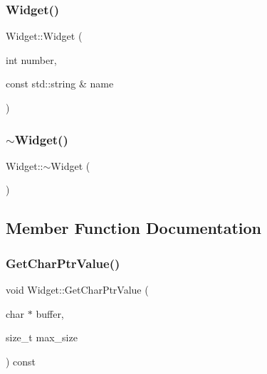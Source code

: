 \subsubsection{\texorpdfstring{Widget()}{Widget()}}
{\footnotesize\ttfamily Widget\+::\+Widget (\begin{DoxyParamCaption}\item[{int}]{number,  }\item[{const std\+::string \&}]{name }\end{DoxyParamCaption})}

\mbox{\label{classWidget_aa24f66bcbaaec6d458b0980e8c8eae65}} 
\subsubsection{\texorpdfstring{$\sim$\+Widget()}{~Widget()}}
{\footnotesize\ttfamily Widget\+::$\sim$\+Widget (\begin{DoxyParamCaption}{ }\end{DoxyParamCaption})}



\subsection{Member Function Documentation}
\mbox{\label{classWidget_a50791a556979f22f5593383143c7f815}} 
\subsubsection{\texorpdfstring{Get\+Char\+Ptr\+Value()}{GetCharPtrValue()}}
{\footnotesize\ttfamily void Widget\+::\+Get\+Char\+Ptr\+Value (\begin{DoxyParamCaption}\item[{char $\ast$}]{buffer,  }\item[{size\+\_\+t}]{max\+\_\+size }\end{DoxyParamCaption}) const}

\mbox{\label{classWidget_abf639d975e02cabda8132873aca1a333}} 
